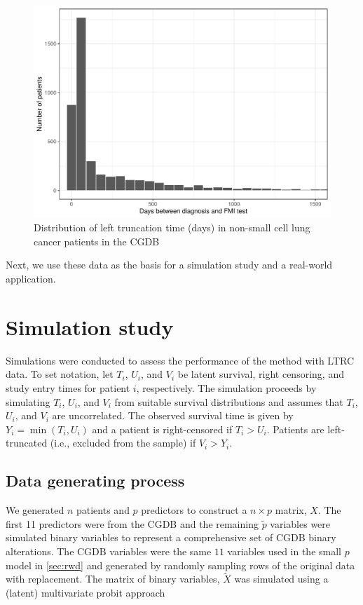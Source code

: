 \documentclass[11pt,final,fleqn]{article}\usepackage[]{graphicx}\usepackage[]{color}
\theoremstyle{plain}
\begin{document}
\begin{figure}[h]
 \centering
\includegraphics[max size={\textwidth}]{figs/left_trunc_hist.pdf} 
\caption{Distribution of left truncation time (days) in non-small cell lung cancer patients in the CGDB}
 \label{fig:left-trunc-time}
\end{figure}

Next, we use these data as the basis for a simulation study and a real-world application.

\section{Simulation study} \label{sec:simulation}
Simulations were conducted to assess the performance of the method with LTRC data. To set notation, let $T_i$, $U_i$, and $V_i$ be latent survival, right censoring, and study entry times for patient $i$, respectively. The simulation proceeds by simulating $T_i$, $U_i$, and $V_i$ from suitable survival distributions and assumes that $T_i$, $U_i$, and $V_i$ are uncorrelated. The observed survival time is given by $Y_i = \min(T_i, U_i)$ and a patient is right-censored if $T_i > U_i$. Patients are left-truncated (i.e., excluded from the sample) if $V_i > Y_i$. 

\subsection{Data generating process}
We generated $n$ patients and $p$ predictors to construct a $n \times p$ matrix, $X$. The first 11 predictors were from the CGDB and the remaining $\tilde{p}$ variables were simulated binary variables to represent a comprehensive set of CGDB binary alterations. The CGDB variables were the same $11$ variables used in the small $p$ model in \autoref{sec:rwd} and generated by randomly sampling rows of the original data with replacement. The matrix of binary variables, $\tilde{X}$ was simulated using a (latent) multivariate probit approach
\end{document}
